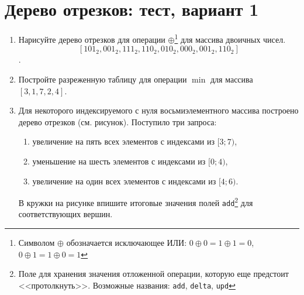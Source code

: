 \documentclass[a4paper,10pt]{article}
\begin{document}
  \section{Дерево отрезков: тест, вариант 1}

  \begin{enumerate}
    \item Нарисуйте дерево отрезков для операции
      $\oplus$\footnote{Символом $\oplus$ обозначается исключающее ИЛИ:
      $0 \oplus 0 = 1 \oplus 1 = 0$, $0 \oplus 1 = 1 \oplus 0 = 1$}
      для массива двоичных чисел.
      $$[101_2, 001_2, 111_2, 110_2, 010_2, 000_2, 001_2, 110_2]$$.

      \vskip 3cm

    \item Постройте разреженную таблицу для операции $\min$
      для массива $[3, 1, 7, 2, 4]$.

      \vskip 3cm

    \item Для некоторого индексируемого с нуля восьмиэлементного
      массива построено дерево отрезков (см. рисунок).
      Поступило три запроса:
      \begin{enumerate} 
        \item увеличение на пять всех элементов с индексами из $[3;7)$,
        \item уменьшение на шесть элементов с индексами из $[0;4)$,
        \item увеличение на один всех элементов с индексами из $[4; 6)$.
      \end{enumerate}

      В кружки на рисунке впишите итоговые значения полей
      \texttt{add}\footnote{Поле для хранения значения отложенной операции, которую еще
      предстоит <<протолкнуть>>. Возможные названия: \texttt{add}, \texttt{delta}, \texttt{upd}}
      для соответствующих вершин.


\end{enumerate}
\end{document}
